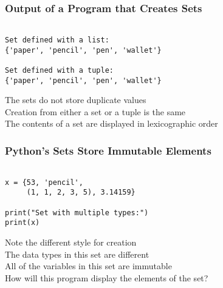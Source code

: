 \documentclass[14pt,aspectratio=169]{beamer}
\begin{document}
%
\begin{frame}[fragile]
  \frametitle{Output of a Program that Creates Sets}
  \normalsize
  \begin{minipage}{6in}
    \vspace*{.25in}
    \begin{verbatim}

Set defined with a list:
{'paper', 'pencil', 'pen', 'wallet'}

Set defined with a tuple:
{'paper', 'pencil', 'pen', 'wallet'}

    \end{verbatim}
  \end{minipage}
  \vspace*{.25in}
  \begin{center}
    \normalsize \noindent The sets do not store duplicate values \\
    \normalsize \noindent Creation from either a set or a tuple is the same \\
    \normalsize \noindent The contents of a set are displayed in lexicographic
    order \\
  \end{center}
\end{frame}

%
\begin{frame}[fragile]
  \frametitle{Python's Sets Store Immutable Elements}
  \normalsize
  \begin{minipage}{6in}
    \vspace*{.25in}
    \begin{verbatim}

x = {53, 'pencil',
     (1, 1, 2, 3, 5), 3.14159}

print("Set with multiple types:")
print(x)

    \end{verbatim}
  \end{minipage}
  \vspace*{.05in}
  \begin{center}
    \normalsize \noindent Note the different style for creation \\
    \normalsize \noindent The data types in this set are different \\
    \normalsize \noindent All of the variables in this set are immutable \\
    \normalsize \noindent How will this program display the elements of the set? \\
  \end{center}
\end{frame}
\end{document}
